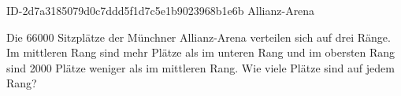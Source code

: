 \begin{exercise}
      {ID-2d7a3185079d0c7ddd5f1d7c5e1b9023968b1e6b}
      {Allianz-Arena}
  \ifproblem\problem\par
    Die \num{66000} Sitzplätze der Münchner Allianz-Arena verteilen sich auf drei Ränge.
    Im mittleren Rang sind  mehr Plätze als im unteren Rang und im obersten
    Rang sind \num{2000} Plätze weniger als im mittleren Rang. Wie viele Plätze sind auf
    jedem Rang?
  \fi
\end{exercise}
